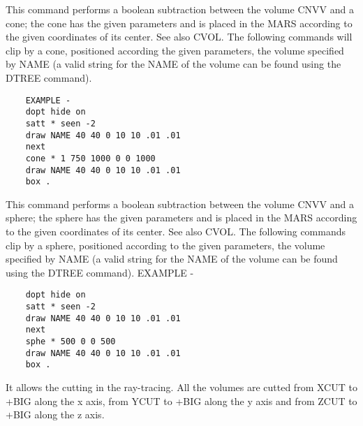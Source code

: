    \par
This command performs a boolean subtraction between the volume CNVV and a 
   cone; the cone has the given parameters and is placed in the MARS according 
   to the given coordinates of its center.  See also CVOL.  The following 
   commands will clip by a cone, positioned according the given parameters, 
   the volume specified by NAME (a valid string for the NAME of the volume can 
   be found using the DTREE command).  
\begin{verbatim}
    EXAMPLE -
    dopt hide on
    satt * seen -2
    draw NAME 40 40 0 10 10 .01 .01
    next
    cone * 1 750 1000 0 0 1000
    draw NAME 40 40 0 10 10 .01 .01
    box .
\end{verbatim}

\ENDCMD


\BEGARG
{}
\ENDARG

   \par
This command performs a boolean subtraction between the volume CNVV and a 
   sphere; the sphere has the given parameters and is placed in the MARS 
   according to the given coordinates of its center.  See also CVOL. The 
   following commands clip by a sphere, positioned according to the given 
   parameters, the volume specified by NAME (a valid string for the NAME of 
   the volume can be found using the DTREE command).  EXAMPLE - 
\begin{verbatim}
    dopt hide on
    satt * seen -2
    draw NAME 40 40 0 10 10 .01 .01
    next
    sphe * 500 0 0 500
    draw NAME 40 40 0 10 10 .01 .01
    box .
\end{verbatim}

\ENDCMD


\BEGARG
{}
\ENDARG

   \par
It allows the cutting in the ray-tracing. All the volumes are cutted from 
   XCUT to +BIG along the x axis, from YCUT to +BIG along the y axis and from 
   ZCUT to +BIG along the z axis.  

